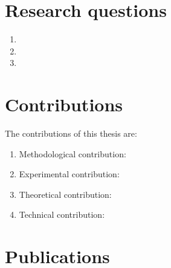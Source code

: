 
\section{Research questions}
\label{intro:definition:rq}


\begin{enumerate}
    \item \rqone

    \item \rqtwo
    
    \item \rqthree
    
\end{enumerate}


\section{Contributions}

The contributions of this thesis are:

\begin{enumerate}[label=(\subscript{C}{{\arabic*}})]
    \item Methodological contribution: \todo{}
    \item Experimental contribution: \todo{}
    \item Theoretical contribution: \todo{}
    \item Technical contribution: \todo{} 
\end{enumerate}

\section{Publications}

